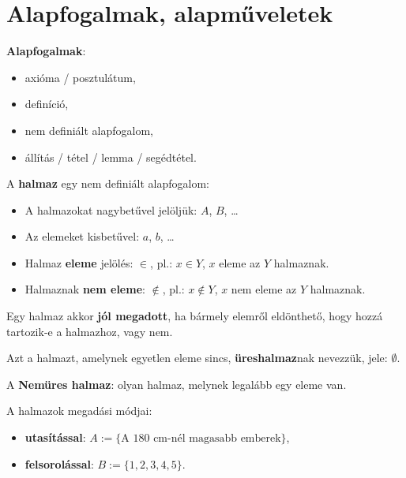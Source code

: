 \clearpage
\section{Alapfogalmak, alapműveletek}\label{sec-01-01}

\begin{blueBox}
  \textbf{Alapfogalmak}:
  \begin{itemize}
    \item axióma / posztulátum,
    \item definíció,
    \item nem definiált alapfogalom,
    \item állítás / tétel / lemma / segédtétel.
  \end{itemize}
\end{blueBox}

\begin{blueBox}
  A \textbf{halmaz} egy nem definiált alapfogalom:
  \begin{itemize}
    \item A halmazokat nagybetűvel jelöljük: $A$, $B$, \dots
    \item Az elemeket kisbetűvel: $a$, $b$, \dots
    \item Halmaz \textbf{eleme} jelölés: $\in$, pl.: $x \in Y$, $x$ eleme az $Y$
          halmaznak.
    \item Halmaznak \textbf{nem eleme}: $\notin$, pl.: $x \notin Y$, $x$ nem
          eleme az $Y$ halmaznak.
  \end{itemize}
\end{blueBox}

\begin{note}
  Egy halmaz akkor \textbf{jól megadott}, ha bármely elemről eldönthető, hogy
  hozzá tartozik-e a halmazhoz, vagy nem.
\end{note}

\begin{definition}[Üreshalmaz]
  Azt a halmazt, amelynek egyetlen eleme sincs, \textbf{üreshalmaz}nak nevezzük,
  jele: $\emptyset$.
\end{definition}

\begin{center}
  \begin{note}
    A \textbf{Nemüres halmaz}: olyan halmaz, melynek legalább egy eleme van.
  \end{note}
\end{center}

\begin{note}
  A halmazok megadási módjai:
  \begin{itemize}
    \item \textbf{utasítással}: $A := \{ \text{A 180 cm-nél magasabb emberek} \}$,
    \item \textbf{felsorolással}: $B := \{ 1, 2, 3, 4, 5 \}$.
  \end{itemize}
\end{note}

